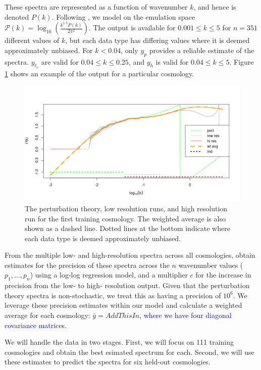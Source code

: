 \documentclass[11pt]{article}
\begin{document}
These spectra are represented as a function of wavenumber $k$, and hence is denoted $P(k)$. Following \cite{moran2023mira}, we model on the emulation space $\mathcal{P}(k)=\log_{10}\left(\frac{k^{1.5}P(k)}{2\pi^2}\right)$. The output is available for $0.001 \leq k \leq 5$ for $n=351$ different values of $k$, but each data type has differing values where it is deemed approximately unbiased. For $k<0.04$, only $y_p$ provides a reliable estimate of the spectra. $y_{\ell_r}$ are valid for $0.04 \leq k \leq 0.25$, and $y_h$ is valid for $0.04 \leq k \leq 5$. Figure \ref{fig:plot_data} shows an example of the output for a particular cosmology.

\begin{figure}[ht]
    \centering
    \includegraphics[width=6in]{plot_data.png}
    \caption{The perturbation theory, low resolution runs, and high resolution run for the first training cosmology. The weighted average is also shown as a dashed line. Dotted lines at the bottom indicate where each data type is deemed approximately unbiased.}
    \label{fig:plot_data}
\end{figure}

From the multiple low- and high-resolution spectra across all cosmologies, \cite{moran2023mira} obtain estimates for the precision of these spectra across the $n$ wavenumber values ($p_1,\dots,p_n$) using a log-log regression model, and a multiplier $c$ for the increase in precision from the low- to high- resolution output. Given that the perturbation theory spectra is non-stochastic, we treat this as having a precision of $10^6$. We leverage these precision estimates within our model and calculate a weighted average for each cosmology: $\bar y = AddThisIn$, \textcolor{blue}{where we have four diagonal covariance matrices.}

We will handle the data in two stages.  First, we will focus on 111 training cosmologies and obtain the best esimated spectrum for each.  Second, we will use these estimates to predict the spectra for six held-out cosmologies.
\end{document}
